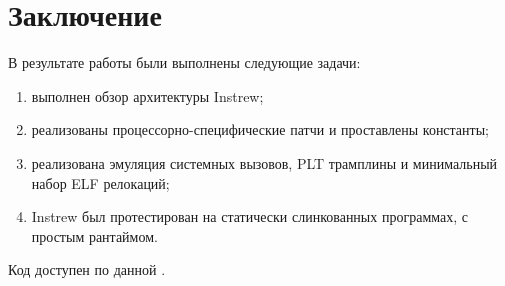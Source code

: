 
\section*{Заключение}
В результате работы были выполнены следующие задачи:
  \vspace{8pt}
  \begin{enumerate}
    \item выполнен обзор архитектуры Instrew;
    \item реализованы процессорно-специфические патчи и проставлены константы;
    \item реализована эмуляция системных вызовов, PLT трамплины и минимальный набор ELF релокаций;
    \item Instrew был протестирован на статически слинкованных программах, с простым рантаймом.
  \end{enumerate}
    Код доступен по данной \href{https://github.com/aengelke/instrew/compare/master...mikhaylovilya:instrew:host-riscv64}{\color{blue}{ссылке}}.




